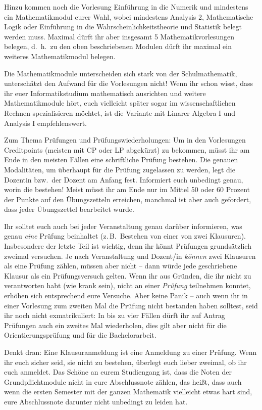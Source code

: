 Hinzu kommen noch die Vorlesung Einführung in die Numerik und mindestens ein
Mathematikmodul eurer Wahl, wobei mindestens Analysis 2, Mathematische Logik
oder Einführung in die Wahrscheinlichkeitstheorie und Statistik belegt werden
muss.  Maximal dürft ihr aber insgesamt 5 Mathematikvorlesungen belegen, d.\
h.\ zu den oben beschriebenen Modulen dürft ihr maximal ein weiteres
Mathematikmodul belegen.

Die Mathematikmodule unterscheiden sich stark von der Schulmathematik,
unterschätzt den Aufwand für die Vorlesungen nicht!  Wenn ihr schon wisst, dass
ihr euer Informatikstudium mathematisch ausrichten und weitere Mathematikmodule
hört, euch vielleicht später sogar im wissenschaftlichen Rechnen spezialisieren
möchtet, ist die Variante mit Linarer Algebra I und Analysis I empfehlenswert.

Zum Thema Prüfungen und Prüfungswiederholungen: Um in den Vorlesungen
Creditpoints (meisten mit CP oder LP abgekürzt) zu bekommen, müsst ihr am Ende
in den meisten Fällen eine schriftliche Prüfung bestehen. Die genauen
Modalitäten, um überhaupt für die Prüfung zugelassen zu werden, legt die
Dozentin bzw.\ der Dozent am Anfang fest.  Informiert euch unbedingt genau,
worin die bestehen! Meist müsst ihr am Ende nur im Mittel 50 oder 60 Prozent
der Punkte auf den Übungszetteln erreichen, manchmal ist aber auch gefordert,
dass jeder Übungszettel bearbeitet wurde.

Ihr solltet euch auch bei jeder Veranstaltung genau darüber informieren, was
genau \emph{eine} Prüfung beinhaltet (z.\,B.\ Bestehen von einer von zwei
Klausuren). Insbesondere der letzte Teil ist wichtig, denn ihr könnt Prüfungen
grundsätzlich zweimal versuchen. Je nach Veranstaltung und Dozent/in
\emph{können} zwei Klausuren als eine Prüfung zählen, müssen aber nicht -- dann
würde jede geschriebene Klausur als ein Prüfungsversuch gelten. Wenn ihr aus
Gründen, die ihr nicht zu verantworten habt (wie krank sein), nicht an einer
\emph{Prüfung} teilnehmen konntet, erhöhen sich entsprechend eure Versuche.
Aber keine Panik -- auch wenn ihr in einer Vorlesung zum zweiten Mal die
Prüfung nicht bestanden haben solltest, seid ihr noch nicht exmatrikuliert: In
bis zu vier Fällen dürft ihr auf Antrag Prüfungen auch ein zweites Mal
wiederholen, dies gilt aber nicht für die Orientierungsprüfung und für die
Bachelorarbeit.

Denkt dran: Eine Klausuranmeldung ist eine Anmeldung zu einer Prüfung. Wenn ihr
euch sicher seid, sie nicht zu bestehen, überlegt euch lieber zweimal, ob ihr
euch anmeldet. Das Schöne an eurem Studiengang ist, dass die Noten der
Grundpflichtmodule nicht in eure Abschlussnote zählen, das heißt, dass auch
wenn die ersten Semester mit der ganzen Mathematik vielleicht etwas hart sind,
eure Abschlussnote darunter nicht unbedingt zu leiden hat.

